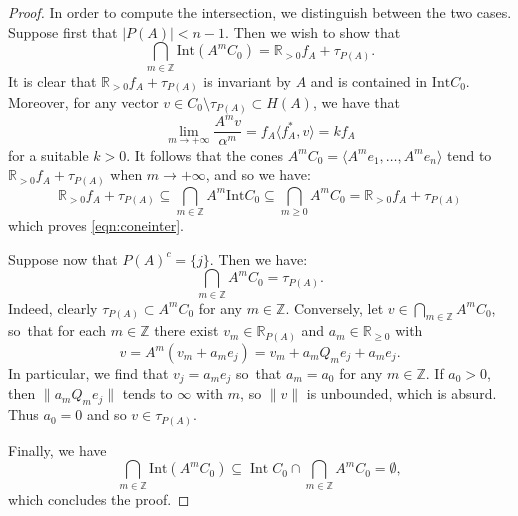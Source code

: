 \documentclass[JEP,XML,SOM,Unicode,NoFloatCountersInSection]{cedram}
\theoremstyle{definition}
\let\sminus\setminus
\newcommand{\RR}{\mathbb{R}}
\newcommand{\ZZ}{\mathbb{Z}}
\DeclareMathOperator{\Int}{Int}
\begin{document}
\begin{proof}
In order to compute the intersection, we distinguish between the two cases. Suppose first that $|P(A)|<n-1$. Then we wish to show that
\begin{equation}\label{eqn:coneinter}
\bigcap_{m\in\ZZ}\mathrm{Int}(A^mC_0)=\RR_{>0}f_A + \tau_{P(A)}.
\end{equation}
It is clear that $\RR_{>0}f_A+\tau_{P(A)}$ is invariant by $A$ and is contained in $\mathrm{Int} C_0$. Moreover, for any vector $v \in C_0 \sminus \tau_{P(A)} \subset H(A)$, we have that
\[
\lim_{m \to +\infty} \frac{A^m v}{\alpha^m} = f_A \langle f_A^*, v \rangle = kf_A
\]
for a suitable $k > 0$. It follows that the cones $A^mC_0=\langle A^me_1,\ldots, A^me_n\rangle$ tend to $\RR_{>0}f_A + \tau_{P(A)}$ when $m \to +\infty$, and so we have:
\begin{equation*}
\RR_{>0}f_A+\tau_{P(A)}\subseteq\bigcap_{m\in\ZZ}A^m\mathrm{Int}C_0\subseteq \bigcap_{m\geq 0}A^mC_0=\RR_{>0}f_A+\tau_{P(A)}
\end{equation*}
which proves \eqref{eqn:coneinter}.

Suppose now that $P(A)^c=\{j\}$. Then we have:
\begin{equation*}
\bigcap_{m\in\ZZ}A^mC_0=\tau_{P(A)}.
\end{equation*}
Indeed, clearly $\tau_{P(A)}\subset A^m C_0$ for any $m\in \ZZ$. Conversely, let $v\in\bigcap_{m\in\ZZ}A^mC_0$, so~that for each $m\in\ZZ$ there exist $v_m\in \RR_{P(A)}$ and $a_m\in\RR_{\geq 0}$ with
\begin{equation*}
v=A^m(v_m+a_me_j)=v_m+a_mQ_me_j+a_me_j.
\end{equation*}
In particular, we find that $v_j=a_me_j$ so~that $a_m=a_0$ for any $m\in\ZZ$. If $a_0>0$, then $\|a_mQ_me_j\|$ tends to $\infty$ with $m$, so $\|v\|$ is unbounded, which is absurd. Thus $a_0=0$ and so $v\in\tau_{P(A)}$.

Finally, we have
\begin{equation*}
\bigcap_{m\in\ZZ}\mathrm{Int}(A^mC_0)\subseteq \Int C_0\cap \bigcap_{m\in\ZZ}A^mC_0=\emptyset,
\end{equation*}
which concludes the proof.
\end{proof}
\end{document}
